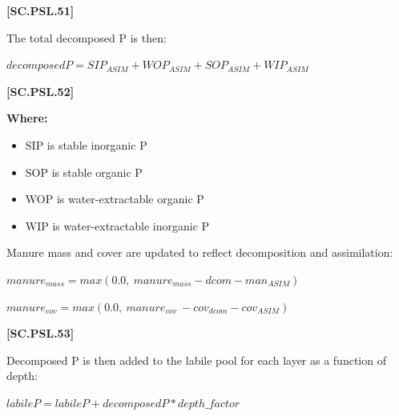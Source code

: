             {\raggedleft \textbf{[SC.PSL.51]}\par}
            \vspace{0.5cm}

The total decomposed P is then:
            \vspace{0.5cm}
        
    \begin{center}
\(decomposedP = SIP_{ASIM} + WOP_{ASIM} + SOP_{ASIM} + WIP_{ASIM}\)
    \end{center}
        \vspace{0.5cm} 
    
            {\raggedleft \textbf{[SC.PSL.52]}\par}
            \vspace{0.5cm}

        \textbf{Where:}

        \begin{itemize}
            \item SIP is stable inorganic P
            \item SOP is stable organic P
            \item WOP is water-extractable organic P
            \item WIP is water-extractable inorganic P
        \end{itemize}
        \vspace{0.5cm}

Manure mass and cover are updated to reflect decomposition and assimilation:
            \vspace{0.5cm}
        
    \begin{center}
\(manure_{mass} = max(0.0,\ manure_{mass} - dcom - man_{ASIM})\)
\vspace{0.1cm}

\(manure_{cov}=max(0.0,\ manure_{cov}\ -cov_{dcom}-cov_{ASIM})\)
    \end{center}
        \vspace{0.5cm} 
    
            {\raggedleft \textbf{[SC.PSL.53]}\par}
            \vspace{0.5cm}

Decomposed P is then added to the labile pool for each layer as a function of depth:
            \vspace{0.5cm}
        
    \begin{center}
\(labileP=labileP+decomposedP * depth\_factor\)
    \end{center}
        \vspace{0.5cm} 
    

